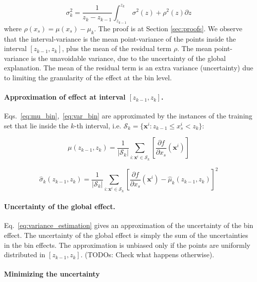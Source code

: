 \documentclass{article}
\newcommand{\dfdx}{\frac{\partial f}{\partial x_s}}
\begin{document}
\begin{equation}
 \sigma^2_k = \frac{1}{z_k - z_{k-1}} \int_{z_{k-1}}^{z_k} \sigma^2(z) + \rho^2(z) \partial z
\end{equation}
%
where \(\rho(x_s) = \mu(x_s) - \mu_k\).
The proof is at Section \ref{sec:proofs}.
We observe that the interval-variance is the mean point-variance of the points
inside the interval \([z_{k-1}, z_k]\), plus the mean of the residual term \(\rho\).
The mean point-variance is the unavoidable variance, due to the uncertainty of the global explanation.
The mean of the residual term is an extra variance (uncertainty) due to limiting the granularity of the effect at
the bin level.

\noindent

\paragraph{Approximation of effect at interval \([z_{k-1}, z_k]\).}
Eqs.~\eqref{eq:mu_bin},~\eqref{eq:var_bin} are
approximated by the instances of the training set that lie inside the
\(k\)-th interval, i.e.
\( \mathcal{S}_k = \{ \mathbf{x}^i : z_{k-1} \leq x^i_s < z_{k} \} \):

\begin{equation}
  \label{eq:mean_estimation}
  \hat{\mu}(z_{k-1}, z_k) = \frac{1}{|\mathcal{S}_k|} \sum_{i:\mathbf{x}^i \in
    \mathcal{S}_k} \left [ \dfdx(\mathbf{x}^i) \right ]
\end{equation}

\begin{equation}
  \label{eq:variance_estimation}
  \hat{\sigma}_k(z_{k-1}, z_k) = \frac{1}{|\mathcal{S}_k|} \sum_{i:\mathbf{x}^i \in
  \mathcal{S}_k} \left [ \dfdx(\mathbf{x}^i) - \hat{\mu}_k(z_{k-1}, z_k) \right ]^2
\end{equation}


\paragraph{Uncertainty of the global effect.}

Eq.~\eqref{eq:variance_estimation} gives an approximation of the
uncertainty of the bin effect.
The uncertainty of the global effect is
simply the sum of the uncertainties in the bin effects.
The
approximation is unbiased only if the points are uniformly distributed
in \([z_{k-1}, z_k]\). (TODOs: Check what happens otherwise).

\paragraph{Minimizing the uncertainty}
\end{document}
